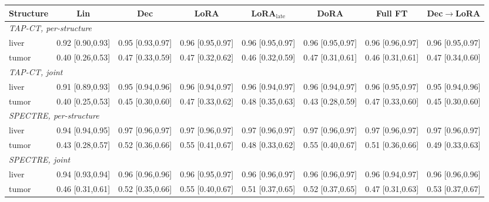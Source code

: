 \begin{tabular}{lccccccc}
\toprule
Structure & Lin & Dec & LoRA & LoRA$_{\text{late}}$ & DoRA & Full FT & Dec$\to$LoRA \\
\midrule
\multicolumn{8}{l}{\textit{TAP-CT, per-structure}} \\
liver & 0.92 [0.90,0.93] & 0.95 [0.93,0.97] & 0.96 [0.95,0.97] & 0.96 [0.95,0.97] & 0.96 [0.95,0.97] & 0.96 [0.96,0.97] & 0.96 [0.95,0.97] \\
tumor & 0.40 [0.26,0.53] & 0.47 [0.33,0.59] & 0.47 [0.32,0.62] & 0.46 [0.32,0.59] & 0.47 [0.31,0.61] & 0.46 [0.31,0.61] & 0.47 [0.34,0.60] \\
\multicolumn{8}{l}{\textit{TAP-CT, joint}} \\
liver & 0.91 [0.89,0.93] & 0.95 [0.94,0.96] & 0.96 [0.94,0.97] & 0.96 [0.94,0.97] & 0.96 [0.94,0.97] & 0.96 [0.95,0.97] & 0.95 [0.94,0.96] \\
tumor & 0.40 [0.25,0.53] & 0.45 [0.30,0.60] & 0.47 [0.33,0.62] & 0.48 [0.35,0.63] & 0.43 [0.28,0.59] & 0.47 [0.33,0.60] & 0.45 [0.30,0.60] \\
\multicolumn{8}{l}{\textit{SPECTRE, per-structure}} \\
liver & 0.94 [0.94,0.95] & 0.97 [0.96,0.97] & 0.97 [0.96,0.97] & 0.97 [0.96,0.97] & 0.97 [0.96,0.97] & 0.97 [0.96,0.97] & 0.97 [0.96,0.97] \\
tumor & 0.43 [0.28,0.57] & 0.52 [0.36,0.66] & 0.55 [0.41,0.67] & 0.48 [0.33,0.62] & 0.55 [0.40,0.67] & 0.51 [0.36,0.66] & 0.49 [0.33,0.63] \\
\multicolumn{8}{l}{\textit{SPECTRE, joint}} \\
liver & 0.94 [0.93,0.94] & 0.96 [0.96,0.96] & 0.96 [0.95,0.97] & 0.96 [0.96,0.97] & 0.96 [0.96,0.97] & 0.96 [0.94,0.97] & 0.96 [0.96,0.96] \\
tumor & 0.46 [0.31,0.61] & 0.52 [0.35,0.66] & 0.55 [0.40,0.67] & 0.51 [0.37,0.65] & 0.52 [0.37,0.65] & 0.47 [0.31,0.63] & 0.53 [0.37,0.67] \\
\bottomrule
\end{tabular}
